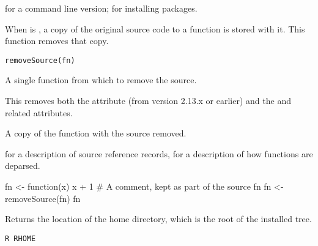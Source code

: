 %
\begin{SeeAlso}\relax
{} for a command line version;
 for installing packages.
\end{SeeAlso}
%
\begin{Description}\relax
When  is , a copy of the
original source code to a function is stored with it.  This function
removes that copy.
\end{Description}
%
\begin{Usage}
\begin{verbatim}
removeSource(fn)
\end{verbatim}
\end{Usage}
%
\begin{Arguments}
\begin{ldescription}
\item[\code{fn}] 
A single function from which to remove the source.

\end{ldescription}
\end{Arguments}
%
\begin{Details}\relax
This removes both the  attribute (from \R{} version
2.13.x or earlier) and the  and related attributes.
\end{Details}
%
\begin{Value}
A copy of the function with the source removed.
\end{Value}
%
\begin{SeeAlso}\relax
{} for a description of source reference records,
 for a description of how functions are deparsed.
\end{SeeAlso}
%
\begin{Examples}
\begin{ExampleCode}
fn <- function(x) {
  x + 1 # A comment, kept as part of the source
}
fn
fn <- removeSource(fn)
fn
\end{ExampleCode}
\end{Examples}
%
\begin{Description}\relax
Returns the location of the \R{} home directory, which is the root of
the installed \R{} tree.
\end{Description}
%
\begin{Usage}
\begin{verbatim}
R RHOME
\end{verbatim}
\end{Usage}
